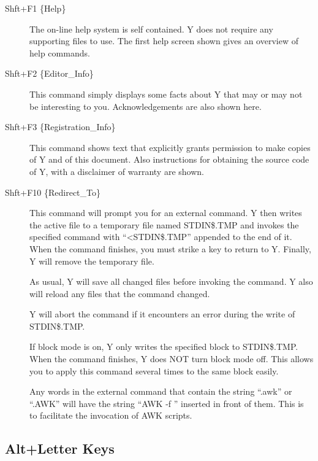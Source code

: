\begin{description}

\item[Shft+F1 \{Help\}] The on-line help system is self contained. Y does not require any
  supporting files to use. The first help screen shown gives an overview of help commands.


\item[Shft+F2 \{Editor\_Info\}] This command simply displays some facts about Y that may or may
  not be interesting to you. Acknowledgements are also shown here.

\item[Shft+F3 \{Registration\_Info\}] This command shows text that explicitly grants permission
  to make copies of Y and of this document. Also instructions for obtaining the source code of
  Y, with a disclaimer of warranty are shown.

\item[Shft+F10 \{Redirect\_To\}] This command will prompt you for an external command. Y then
  writes the active file to a temporary file named STDIN\$.TMP and invokes the specified command
  with ``<STDIN\$.TMP'' appended to the end of it. When the command finishes, you must strike a
  key to return to Y. Finally, Y will remove the temporary file.

  As usual, Y will save all changed files before invoking the command. Y also will reload any
  files that the command changed.

  Y will abort the command if it encounters an error during the write of STDIN\$.TMP.

  If block mode is on, Y only writes the specified block to STDIN\$.TMP. When the command
  finishes, Y does NOT turn block mode off. This allows you to apply this command several times
  to the same block easily.

  Any words in the external command that contain the string ``.awk'' or ``.AWK'' will have the
  string ``AWK -f '' inserted in front of them. This is to facilitate the invocation of AWK
  scripts.

\end{description}

\subsection{Alt+Letter Keys}

